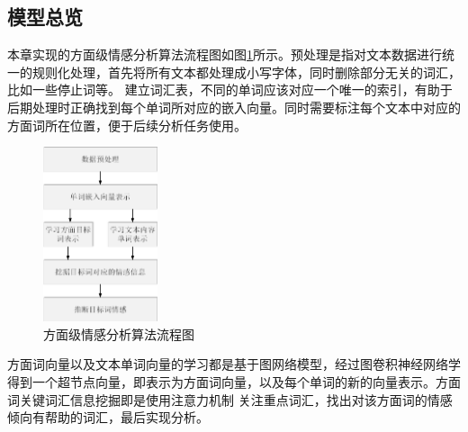 \subsection{模型总览}
本章实现的方面级情感分析算法流程图如图\ref{asgraphLct}所示。预处理是指对文本数据进行统一的规则化处理，首先将所有文本都处理成小写字体，同时删除部分无关的词汇，比如一些停止词等。
建立词汇表，不同的单词应该对应一个唯一的索引，有助于后期处理时正确找到每个单词所对应的嵌入向量。同时需要标注每个文本中对应的方面词所在位置，便于后续分析任务使用。
\begin{figure}[htb]
	\setlength{\belowcaptionskip}{0pt}
	\centering
	\includegraphics[width=0.3\textwidth]{pic/asgraph.png}
	\caption{方面级情感分析算法流程图}
	\label{asgraphLct}
\end{figure}
方面词向量以及文本单词向量的学习都是基于图网络模型，经过图卷积神经网络学得到一个超节点向量，即表示为方面词向量，以及每个单词的新的向量表示。方面词关键词汇信息挖掘即是使用注意力机制
关注重点词汇，找出对该方面词的情感倾向有帮助的词汇，最后实现分析。

